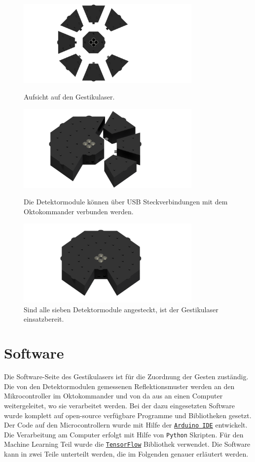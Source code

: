 \begin{figure}[h]
	\centering
	\includegraphics[width=9cm]{../CAD_Bilder/Gestikulaser_raytraced_2.png}
	\caption{Aufsicht auf den Gestikulaser.}
	\label{fig:AufsichtGestikulaser}
	\vfill
	\includegraphics[width=9cm]{../CAD_Bilder/Gestikulaser_raytraced_4.png}
	\caption{Die Detektormodule können über USB Steckverbindungen mit dem Oktokommander verbunden werden.}
	\label{fig:Gestikulaser}
	\vfill
	\includegraphics[width=9cm]{../CAD_Bilder/Gestikulaser_raytraced.png}
	\caption{Sind alle sieben Detektormodule angesteckt, ist der Gestikulaser einsatzbereit.}
	\label{fig:Gestikulaser}
\end{figure}



\section{Software}
\label{sec:Software}

Die Software-Seite des Gestikulasers ist für die Zuordnung der Gesten zuständig. Die von den Detektormodulen gemessenen Reflektionsmuster werden an den Mikrocontroller im Oktokommander und von da aus an einen Computer weitergeleitet, wo sie verarbeitet werden. Bei der dazu eingesetzten Software wurde komplett auf open-source verfügbare Programme und Bibliotheken gesetzt. Der Code auf den Microcontrollern wurde mit Hilfe der \href{https://www.arduino.cc/en/Main/Software}{\texttt{Arduino IDE}} entwickelt. Die Verarbeitung am Computer erfolgt mit Hilfe von \texttt{Python} Skripten. Für den Machine Learning Teil wurde die \href{https://www.tensorflow.org/}{\texttt{TensorFlow}\texttrademark} Bibliothek verwendet. Die Software kann in zwei Teile unterteilt werden, die im Folgenden genauer erläutert werden.


